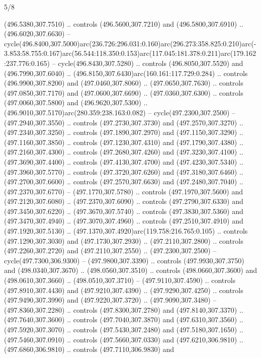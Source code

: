 \begin{flagdescription}{5/8}
\begin{scope}[xshift=0.5\flaglength,yshift=0.5\flagwidth,scale=\flagwidth/475.63]
\begin{scope}[y=0.8pt, x=0.8pt, yscale=-1, xscale=1,shift={(-450,-300)}]
\begin{scope}[cm={{1.0,0.0,0.0,1.0,(-0.0002,0.12556)}},cm={{1.0,0.0,0.0,1.0,(0.00179,0.0)}}]
\begin{scope}[cm={{1.11592,0.0,0.0,1.11592,(-106.89933,-41.77764)}}]
\begin{scope}[draw=black,fill=cfff]
\begin{scope}[fill=black]
  (496.5380,307.7510) .. controls (496.5600,307.7210) and (496.5800,307.6910) ..
  (496.6020,307.6630) --
  cycle(496.8400,307.5000)arc(236.726:296.031:0.160)arc(296.273:358.825:0.210)arc(-3.853:58.755:0.167)arc(56.544:118.350:0.153)arc(117.045:181.378:0.211)arc(179.162:237.776:0.165)
  -- cycle(496.8430,307.5280) .. controls (496.8050,307.5520) and
  (496.7990,307.6040) .. (496.8150,307.6430)arc(160.161:117.729:0.284) ..
  controls (496.9900,307.8200) and (497.0460,307.8060) .. (497.0650,307.7630) ..
  controls (497.0850,307.7170) and (497.0600,307.6690) .. (497.0360,307.6300) ..
  controls (497.0060,307.5800) and (496.9620,307.5300) ..
  (496.9010,307.5170)arc(280.359:238.163:0.082) -- cycle(497.2300,307.2500) --
  (497.2940,307.3550) .. controls (497.2730,307.3730) and (497.2570,307.3270) ..
  (497.2340,307.3250) .. controls (497.1890,307.2970) and (497.1150,307.3290) ..
  (497.1160,307.3850) .. controls (497.1230,307.4310) and (497.1790,307.4380) ..
  (497.2160,307.4300) .. controls (497.2680,307.4260) and (497.3230,307.4100) ..
  (497.3690,307.4400) .. controls (497.4130,307.4700) and (497.4230,307.5340) ..
  (497.3960,307.5770) .. controls (497.3720,307.6260) and (497.3180,307.6460) ..
  (497.2700,307.6600) .. controls (497.2570,307.6630) and (497.2480,307.7040) ..
  (497.2370,307.6770) -- (497.1770,307.5780) .. controls (497.1970,307.5600) and
  (497.2120,307.6080) .. (497.2370,307.6090) .. controls (497.2790,307.6330) and
  (497.3450,307.6220) .. (497.3670,307.5740) .. controls (497.3830,307.5360) and
  (497.3470,307.4940) .. (497.3070,307.4960) .. controls (497.2510,307.4910) and
  (497.1920,307.5130) .. (497.1370,307.4920)arc(119.758:216.765:0.105) ..
  controls (497.1290,307.3030) and (497.1730,307.2930) .. (497.2110,307.2800) ..
  controls (497.2260,307.2720) and (497.2110,307.2550) .. (497.2300,307.2500) --
  cycle(497.7300,306.9300) -- (497.9800,307.3390) .. controls
  (497.9930,307.3750) and (498.0340,307.3670) .. (498.0560,307.3510) .. controls
  (498.0660,307.3600) and (498.0610,307.3660) .. (498.0510,307.3710) --
  (497.9110,307.4590) .. controls (497.8910,307.4430) and (497.9210,307.4390) ..
  (497.9290,307.4250) .. controls (497.9490,307.3990) and (497.9220,307.3720) ..
  (497.9090,307.3480) -- (497.8360,307.2280) .. controls (497.8300,307.2780) and
  (497.8140,307.3370) .. (497.7640,307.3600) .. controls (497.7040,307.3870) and
  (497.6310,307.3560) .. (497.5920,307.3070) .. controls (497.5430,307.2480) and
  (497.5180,307.1650) .. (497.5460,307.0910) .. controls (497.5660,307.0330) and
  (497.6210,306.9810) .. (497.6860,306.9810) .. controls (497.7110,306.9830) and

\end{scope}
\end{scope}
\end{scope}
\end{scope}
\end{scope}
\end{scope}
\end{flagdescription}

